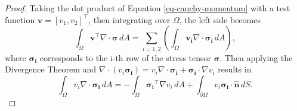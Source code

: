 \documentclass[a4paper,english]{elsarticle}%
\begin{document}
\begin{proof}
Taking the dot product of  Equation \eqref{eq-cauchy-momentum} with a test function $\boldsymbol{v} = [v_1, v_2]^\intercal$, then integrating over $\Omega$, the left side becomes
\begin{equation} \label{eq-cauchy-expand}
    \int_\Omega{\boldsymbol{v}^\intercal \nabla \cdot \boldsymbol{\sigma}} \,dA = \sum_{i = 1,2}\left(\int_\Omega{\boldsymbol{v_i} \nabla \cdot \boldsymbol{\sigma_i}} \,dA \right),
\end{equation}
where $\boldsymbol{\sigma_i}$ corresponds to the i-th row of the stress tensor $\boldsymbol{\sigma}$. 
Then applying the Divergence Theorem and $\nabla \cdot (v_i \boldsymbol{\sigma_i})  = v_i \nabla \cdot \boldsymbol{\sigma_i} + \boldsymbol{\sigma_i} \cdot \nabla v_i$ results in 
\begin{equation} \label{eq-div-theorem-to-Cauchy-momentum}
    \int_\Omega{{v_i} \nabla \cdot \boldsymbol{\sigma_i}}  \,dA = -\int_\Omega{\boldsymbol{\sigma_i}^\intercal \nabla v_i}  \,dA +  \int_{\partial \Omega}{v_i \boldsymbol{\sigma_i} \cdot \boldsymbol{\hat{n}} }  \,dS.
\end{equation}


\end{proof}
\end{document}
